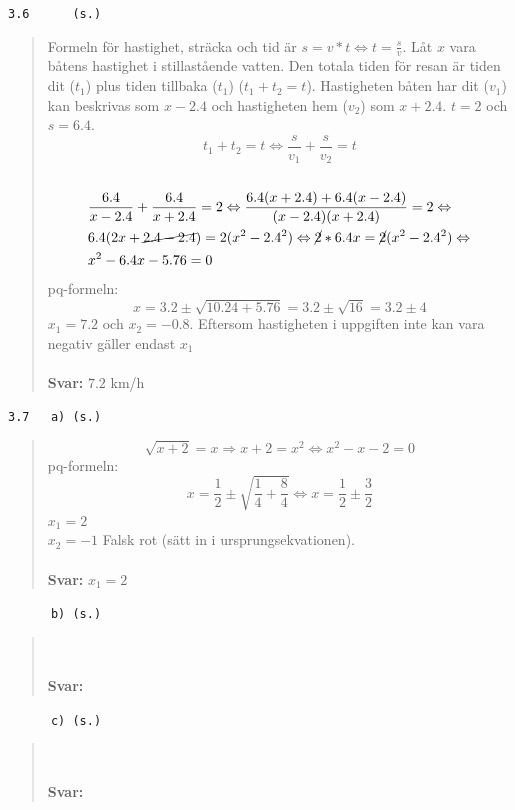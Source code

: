 \documentclass[a4paper]{article}
\newcommand{\tskcol}[1]{\textcolor{tskcol}{#1}}
\begin{document}
	\texttt{\tskcol{3.6~~~~~ (s.)}}
	\begin{quotation}
		\noindent
		Formeln för hastighet, sträcka och tid är $s=v*t \Leftrightarrow t=\frac{s}{v}$. Låt $x$ vara båtens hastighet i stillastående vatten. Den totala tiden för resan är tiden dit ($t_1$) plus tiden tillbaka ($t_1$) ($t_1+t_2=t$).
		Hastigheten båten har dit ($v_1$) kan beskrivas som $x-2.4$ och hastigheten hem ($v_2$) som $x+2.4$. $t=2$ och $s=6.4$.
		\[t_1+t_2=t\Leftrightarrow
		\frac{s}{v_1}+\frac{s}{v_2}=t\] \\
		\begin{align*}
		&\frac{6.4}{x-2.4}+\frac{6.4}{x+2.4} = 2 \Leftrightarrow
		\frac{6.4(x+2.4)+6.4(x-2.4)}{(x-2.4)(x+2.4)} = 2 \Leftrightarrow \\
		&6.4(2x+\cancel{2.4-2.4})=2(x^2-2.4^2) \Leftrightarrow
		\cancel{2}*6.4x=\cancel{2}(x^2-2.4^2) \Leftrightarrow \\
		&x^2-6.4x-5.76=0
		\end{align*}
		pq-formeln:
		\[x=3.2\pm\sqrt{10.24+5.76} =3.2\pm\sqrt{16}=3.2\pm 4\]
		$x_1=7.2$ och $x_2=-0.8$. Eftersom hastigheten i uppgiften inte kan vara negativ gäller endast $x_1$
		\\ \\
		\textbf{Svar:} $7.2$ km/h 
	\end{quotation}
	
	\texttt{\tskcol{3.7~~~a) (s.)}}
	\begin{quotation}
		\noindent
		\[\sqrt{x+2}=x \Rightarrow
		x+2=x^2 \Leftrightarrow
		x^2-x-2=0 \]
		pq-formeln: \\
		\[x=\frac{1}{2}\pm\sqrt{\frac{1}{4}+\frac{8}{4}} \Leftrightarrow
		x=\frac{1}{2}\pm\frac{3}{2}\]
		$x_1=2$ \\
		$x_2=-1$ Falsk rot (sätt in i ursprungsekvationen).
		\\ \\
		\textbf{Svar:} $x_1=2$
	\end{quotation}
	
	\texttt{\tskcol{~~~~~~b) (s.)}}
	\begin{quotation}
		\noindent
		\\ \\
		\textbf{Svar:} 
	\end{quotation}
	
	\texttt{\tskcol{~~~~~~c) (s.)}}
	\begin{quotation}
		\noindent
		\\ \\
		\textbf{Svar:} 
	\end{quotation}
	
\end{document}
